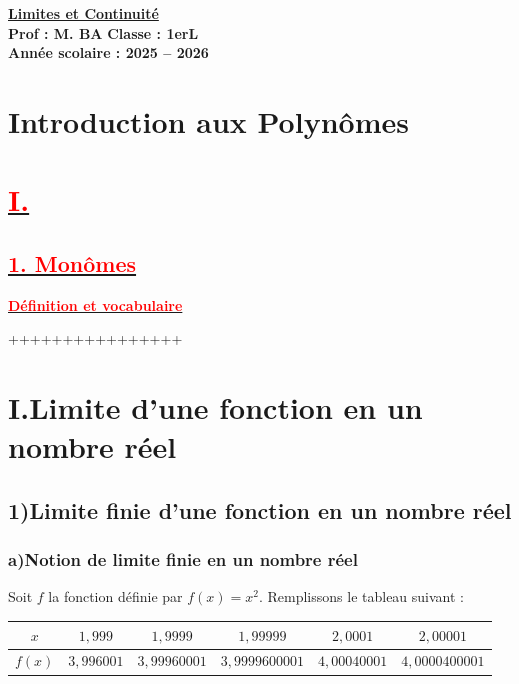 \documentclass[12pt,a4paper]{article}
\begin{document}
\begin{center}
    \Large\textbf{\underline{Limites et Continuité}}\\[-0.1cm]
    \normalsize\textbf{Prof : M. BA} \hfill \textbf{Classe : 1erL}\\[-0.1cm]
    \textbf{Année scolaire : 2025 -- 2026}
\end{center}

\section*{Introduction aux Polynômes}

\section*{\underline{\textbf{\textcolor{red}{I.  }}}}
\subsection*{\underline{\textbf{\textcolor{red}{1. Monômes}}}} 
\underline{\textbf{\textcolor{red}{Définition et vocabulaire}}}

++++++++++++++++
\section*{I.\quad Limite d’une fonction en un nombre réel}

\subsection*{1)\quad Limite finie d’une fonction en un nombre réel}

\subsubsection*{a)\quad Notion de limite finie en un nombre réel}

Soit $f$ la fonction définie par $f(x)=x^2$. Remplissons le tableau suivant :

\begin{center}
\begin{tabular}{|c|c|c|c|c|c|}
\hline
$x$ & $1{,}999$ & $1{,}9999$ & $1{,}99999$ & $2{,}0001$ & $2{,}00001$ \\
\hline
$f(x)$ & $3{,}996001$ & $3{,}99960001$ & $3{,}9999600001$ & $4{,}00040001$ & $4{,}0000400001$ \\
\hline
\end{tabular}
\end{center}
\end{document}
